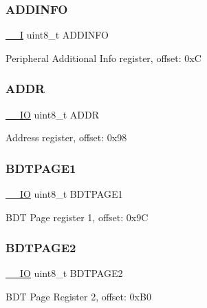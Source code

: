 \subsubsection{\texorpdfstring{ADDINFO}{ADDINFO}}
{\footnotesize\ttfamily \mbox{\hyperlink{core__cm0plus_8h_af63697ed9952cc71e1225efe205f6cd3}{\+\_\+\+\_\+I}} uint8\+\_\+t A\+D\+D\+I\+N\+FO}

Peripheral Additional Info register, offset\+: 0xC \mbox{\label{struct_u_s_b___type_a6e9a6805bc92c5472f62e96726172684}} 
\subsubsection{\texorpdfstring{ADDR}{ADDR}}
{\footnotesize\ttfamily \mbox{\hyperlink{core__cm0plus_8h_aec43007d9998a0a0e01faede4133d6be}{\+\_\+\+\_\+\+IO}} uint8\+\_\+t A\+D\+DR}

Address register, offset\+: 0x98 \mbox{\label{struct_u_s_b___type_aa7781256e3a9e7b62eb5a91f8dde5161}} 
\subsubsection{\texorpdfstring{BDTPAGE1}{BDTPAGE1}}
{\footnotesize\ttfamily \mbox{\hyperlink{core__cm0plus_8h_aec43007d9998a0a0e01faede4133d6be}{\+\_\+\+\_\+\+IO}} uint8\+\_\+t B\+D\+T\+P\+A\+G\+E1}

B\+DT Page register 1, offset\+: 0x9C \mbox{\label{struct_u_s_b___type_a3fe7074e6a65a34004b987874bba06e1}} 
\subsubsection{\texorpdfstring{BDTPAGE2}{BDTPAGE2}}
{\footnotesize\ttfamily \mbox{\hyperlink{core__cm0plus_8h_aec43007d9998a0a0e01faede4133d6be}{\+\_\+\+\_\+\+IO}} uint8\+\_\+t B\+D\+T\+P\+A\+G\+E2}

B\+DT Page Register 2, offset\+: 0x\+B0 \mbox{\label{struct_u_s_b___type_af9ace2f6c534877065e28aef9a09512a}} 
